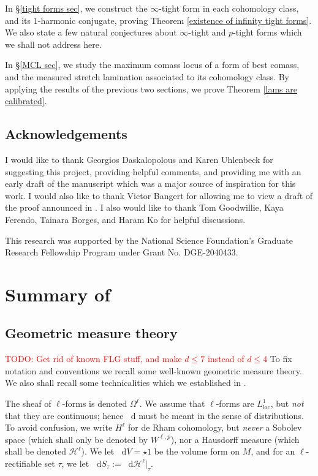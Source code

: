 \documentclass[reqno,11pt]{amsart}
\newcommand*\dif{\mathop{}\!\mathrm{d}}
\newcommand{\loc}{\mathrm{loc}}
\theoremstyle{definition}
\numberwithin{equation}{section}
\newcommand\todo[1]{\textcolor{red}{TODO: #1}}
\begin{document}
In \S\ref{tight forms sec}, we construct the $\infty$-tight form in each cohomology class, and its $1$-harmonic conjugate, proving Theorem \ref{existence of infinity tight forms}.
We also state a few natural conjectures about $\infty$-tight and $p$-tight forms which we shall not address here.

In \S\ref{MCL sec}, we study the maximum comass locus of a form of best comass, and the measured stretch lamination associated to its cohomology class.
By applying the results of the previous two sections, we prove Theorem \ref{lams are calibrated}.


\subsection{Acknowledgements}
I would like to thank Georgios Daskalopolous and Karen Uhlenbeck for suggesting this project, providing helpful comments, and providing me with an early draft of the manuscript \cite{daskalopoulos2023} which was a major source of inspiration for this work.
I would also like to thank Victor Bangert for allowing me to view a draft of the proof announced in \cite{Auer01}.
I also would like to thank Tom Goodwillie, Kaya Ferendo, Tainara Borges, and Haram Ko for helpful discussions.

This research was supported by the National Science Foundation's Graduate Research Fellowship Program under Grant No. DGE-2040433.


\section{Summary of \texorpdfstring{\cite{BackusFLG,BackusCML}}{previous results}}
\subsection{Geometric measure theory}
\todo{Get rid of known FLG stuff, and make $d \leq 7$ instead of $d \leq 4$}
To fix notation and conventions we recall some well-known geometric measure theory.
We also shall recall some technicalities which we established in \cite{BackusFLG}.

The sheaf of $\ell$-forms is denoted $\Omega^\ell$.
We assume that $\ell$-forms are $L^1_\loc$, but \emph{not} that they are continuous; hence $\dif$ must be meant in the sense of distributions.
To avoid confusion, we write $H^\ell$ for de Rham cohomology, but \emph{never} a Sobolev space (which shall only be denoted by $W^{\ell, p}$), nor a Hausdorff measure (which shall be denoted $\mathcal H^\ell$).
We let $\dif V = \star 1$ be the volume form on $M$, and for an $\ell$-rectifiable set $\tau$, we let $\dif S_\tau := \dif \mathcal H^\ell|_\tau$.
\end{document}
